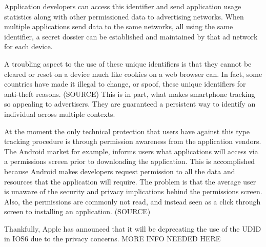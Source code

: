 Application developers can access this identifier and send application usage statistics along with other permissioned data to advertising networks. When multiple applications send data to the same networks, all using the same identifier, a secret dossier can be established and maintained by that ad network for each device.

A troubling aspect to the use of these unique identifiers is that they cannot be cleared or reset on a device much like cookies on a web browser can. In fact, some countries have made it illegal to change, or spoof, these unique identifiers for anti-theft reasons. (SOURCE) This is in part, what makes smartphone tracking so appealing to advertisers. They are guaranteed a persistent way to identify an individual across multiple contexts.

At the moment the only technical protection that users have against this type tracking procedure is through permission awareness from the application vendors. The Android market for example, informs users what applications will access via a permissions screen prior to downloading the application. This is accomplished because Android makes developers request permission to all the data and resources that the application will require. The problem is that the average user is unaware of the security and privacy implications behind the permissions screen. Also, the permissions are commonly not read, and instead seen as a click through screen to installing an application. (SOURCE)  

Thankfully, Apple has announced that it will be deprecating the use of the UDID in IOS6 due to the privacy concerns. MORE INFO NEEDED HERE